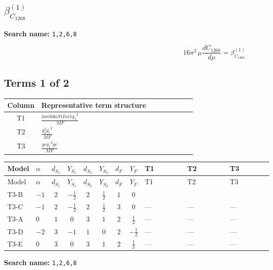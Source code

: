 \documentclass[8pt]{article}
\begin{document}
\begin{landscape}
\section*{$\beta_{C_{1268}}^{(1)}$}
\noindent\textbf{Search name: }\texttt{1,2,6,8}\par\smallskip
\[16\pi^2\,\mu\frac{d C_{1268}}{d\mu}=\beta_{C_{1268}}^{(1)}\]
\subsection*{Terms 1 of 2}
\begin{center}
\begin{tabular}{@{}c >{\raggedright\arraybackslash}p{0.82\linewidth}@{}}
\toprule
Column & Representative term structure \\
\midrule
T1 & \(\displaystyle \frac{lambdaS1Inv1 \overline{y_{1}}^{2}}{MF}\) \\
\midrule
T2 & \(\displaystyle \frac{g_{2}^{2} \overline{y_{1}}^{2}}{MF}\) \\
\midrule
T3 & \(\displaystyle \frac{ye \overline{y_{1}}^{2} \overline{ye}}{MF}\) \\
\midrule
\bottomrule
\end{tabular}
\end{center}
\smallskip
\tiny
\begin{longtable}{@{}llcccccc >{\raggedright\arraybackslash}p{0.21\linewidth} >{\raggedright\arraybackslash}p{0.21\linewidth} >{\raggedright\arraybackslash}p{0.21\linewidth}@{}}
\toprule
Model & $\alpha$ & $d_{S_1}$ & $Y_{S_1}$ & $d_{S_2}$ & $Y_{S_2}$ & $d_F$ & $Y_F$ & T1 & T2 & T3 \\
\midrule
\endfirsthead
\toprule
Model & $\alpha$ & $d_{S_1}$ & $Y_{S_1}$ & $d_{S_2}$ & $Y_{S_2}$ & $d_F$ & $Y_F$ & T1 & T2 & T3 \\
\midrule
\endhead
T3-B & $-1$ & $2$ & $-\frac{1}{2}$ & $2$ & $\frac{1}{2}$ & $1$ & $0$ & \scriptsize\adjustbox{max width=\linewidth}{$\begin{gathered} \frac{lambdaS1Inv1 \overline{y_{1}}^{2}}{4 MF}\end{gathered}$} & \scriptsize\adjustbox{max width=\linewidth}{$\begin{gathered} \frac{3 g_{2}^{2} \overline{y_{1}}^{2}}{8 MF}\end{gathered}$} & \scriptsize\adjustbox{max width=\linewidth}{$\begin{gathered} - \frac{ye \overline{y_{1}}^{2} \overline{ye}}{8 MF}\end{gathered}$} \\
\midrule
T3-C & $-1$ & $2$ & $-\frac{1}{2}$ & $2$ & $\frac{1}{2}$ & $3$ & $0$ & --- & --- & --- \\
\midrule
T3-A & $0$ & $1$ & $0$ & $3$ & $1$ & $2$ & $\frac{1}{2}$ & --- & --- & --- \\
\midrule
T3-D & $-2$ & $3$ & $-1$ & $1$ & $0$ & $2$ & $-\frac{1}{2}$ & --- & --- & --- \\
\midrule
T3-E & $0$ & $3$ & $0$ & $3$ & $1$ & $2$ & $\frac{1}{2}$ & --- & --- & --- \\
\midrule
\bottomrule
\end{longtable}
\clearpage
\noindent\textbf{Search name: }\texttt{1,2,6,8}\par\smallskip

\end{landscape}
\end{document}

